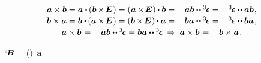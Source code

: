 \nopagebreak
\begin{equation}\label{crossproductoftwovectors}
\begin{array}{c}
\bm{a} \times \bm{b}
= \bm{a} \dotp \hspace{-0.1ex}
\left(
   \bm{b}
   \hspace{-0.1ex} \times \hspace{-0.25ex}
   \UnitDyad
   \hspace{.1ex} \right)
= \left( \bm{a} \hspace{-0.1ex} \times \hspace{-0.25ex} \UnitDyad \hspace{.1ex} \right) \hspace{-0.1ex} \dotp \bm{b}
= - \hspace{.25ex} \bm{a} \bm{b} \dotdotp \permutationsparitytensor
= - \hspace{.2ex} \permutationsparitytensor \dotdotp \bm{a} \bm{b}
\hspace{.15ex} ,
\\[.15em]
%
\bm{b} \times \bm{a}
= \bm{b} \dotp \hspace{-0.1ex} \left( \bm{a} \hspace{-0.1ex} \times \hspace{-0.25ex} \UnitDyad \hspace{.1ex} \right)
= \left( \bm{b} \hspace{-0.1ex} \times \hspace{-0.25ex} \UnitDyad \hspace{.1ex} \right)  \hspace{-0.1ex} \dotp \bm{a}
= - \hspace{.25ex} \bm{b} \bm{a} \dotdotp \permutationsparitytensor
= - \hspace{.2ex} \permutationsparitytensor \dotdotp \bm{b} \bm{a}
\hspace{.15ex} ,
\\[.2em]
%
\bm{a} \times \bm{b} \hspace{.16ex}
= - \hspace{.33ex} \bm{a} \bm{b} \dotdotp \permutationsparitytensor
= \bm{b} \bm{a} \dotdotp \permutationsparitytensor
\:\Rightarrow\:
\bm{a} \times \bm{b} \hspace{.16ex} = - \hspace{.32ex} \bm{b} \times \bm{a}
\hspace{.2ex} .
\end{array}
\end{equation}

\vspace{-0.2em} \noindent
{}  ~${\hspace{-0.2ex}^2\hspace{-0.16em}\bm{B}}$
~~()~$\bm{a}$

